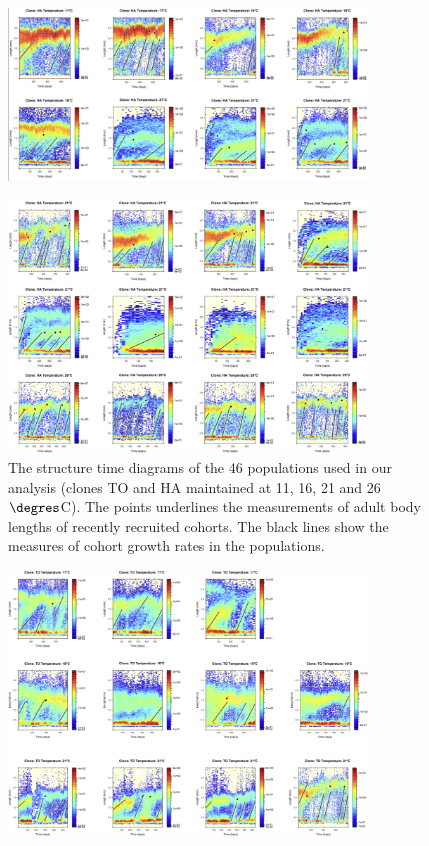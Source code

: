 \begin{figure}
  \centering 
  \includegraphics[width=0.85\textwidth]{5_ChapExp3/fig/FigS2-1} 
\end{figure}
\begin{figure}
  \centering 
  \includegraphics[width=0.85\textwidth]{5_ChapExp3/fig/FigS2-2} 
  \caption[The
  structure time diagrams of the 46 populations used in our analysis]{The
  structure time diagrams of the 46 populations used in our analysis (clones TO and HA maintained at 11, 16, 21 and 26$\degres$C). The points underlines the
  measurements of adult body lengths of recently recruited cohorts. The black
  lines show the measures of cohort growth rates in the populations.}
\end{figure}
\begin{figure}
  \centering 
  \includegraphics[width=0.85\textwidth]{5_ChapExp3/fig/FigS2-3} 
\end{figure}
